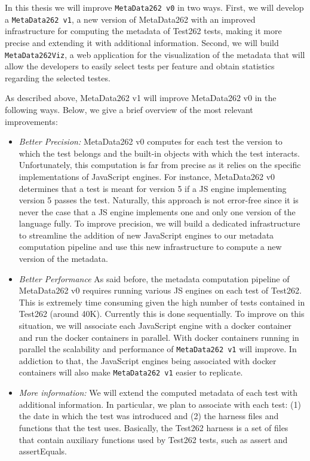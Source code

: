 \documentclass[runningheads]{llncs}
\begin{document}
In this thesis we will improve \texttt{MetaData262 v0} in two ways. First, we will develop a \texttt{MetaData262 v1}, a new version of MetaData262 with an improved infrastructure for computing the metadata of Test262 tests, making it more precise and extending it with additional information. Second, we will build \texttt{MetaData262Viz}, a web application for the visualization of the metadata that will allow the developers to easily select tests per feature and obtain statistics regarding the selected testes.

As described above, MetaData262 v1 will improve MetaData262 v0 in the following ways. Below, we give a brief overview of the most relevant improvements:

\begin{itemize}
\item \emph{Better Precision:} MetaData262 v0 computes for each test the version to which the test belongs and the built-in objects with which the test interacts. Unfortunately, this computation is far from precise as it relies on the specific implementations of JavaScript engines. For instance, MetaData262 v0 determines that a test is meant for version 5 if a JS engine implementing version 5 passes the test. Naturally, this approach is not error-free since it is never the case that a JS engine implements one and only one version of the language fully. To improve precision, we will build a dedicated infrastructure to streamline the addition of new JavaScript engines to our metadata computation pipeline and use this new infrastructure to compute a new version of the metadata.
%
\item \emph{Better Performance} As said before, the metadata computation pipeline of MetaData262 v0 requires running various JS engines on each test of Test262. This is extremely time consuming given the high number of tests contained in Test262 (around 40K). 
Currently this is done sequentially. To improve on this situation, we will associate each JavaScript engine with a docker container and run the docker containers in parallel. With docker containers running in parallel the scalability and performance of \texttt{MetaData262 v1} will improve. In addiction to that, the JavaScript engines being associated with docker containers will also make \texttt{MetaData262 v1} easier to replicate.
%
\item \emph{More information:} We will extend the computed metadata of each test with additional information. In particular, we plan to associate with each test: (1) the date in  which the test was introduced and (2) the harness files and functions that the test uses. Basically, the Test262 harness is a set of files that contain auxiliary functions used by Test262 tests, such as assert and assertEquals. 
\end{itemize}
\end{document}
